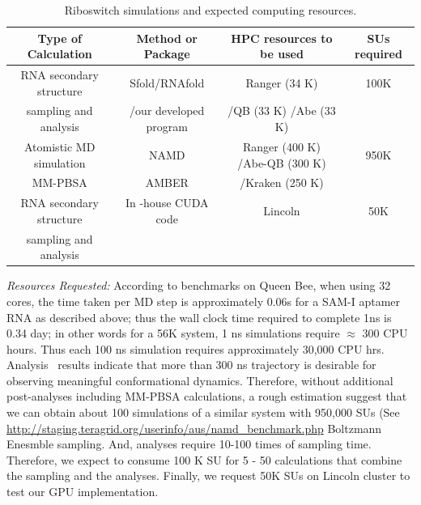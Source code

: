 \documentclass[a4paper,10pt]{article}
\newcommand{\up}{\vspace*{-1em}}
\begin{document}
\begin{table}[h]
\up
\begin{center}
  \caption{Riboswitch simulations and expected computing resources.  }
\label{table:systems}
\begin{tabular}{| c | c | c | c |}
\hline
Type of Calculation &   Method or Package  &    HPC resources to be used & SUs required \\
\hline \hline
RNA secondary structure &
Sfold/RNAfold& Ranger (34 K) & 100K\\ 
sampling and analysis  & /our developed program  & /QB (33 K) /Abe (33 K) & \\  \hline
Atomistic MD simulation & NAMD  & Ranger (400 K) /Abe-QB (300 K)  & 950K \\  
MM-PBSA        & AMBER    & /Kraken (250 K) &  \\ \hline
RNA secondary structure & In -house CUDA code & Lincoln & 50K \\
 sampling and analysis &   
&  &  \\
\hline
\end{tabular}
\up\up
\end{center}

\end{table}

{\it Resources Requested: } According to benchmarks on Queen Bee, when using 32 cores, the time taken per MD step is approximately 0.06s for a SAM-I aptamer RNA as described above; thus the wall clock time required to complete 1ns is 0.34 day; in other words for a 56K system, 1 ns simulations require $\approx$ 300 CPU hours.  Thus each 100 ns simulation requires approximately 30,000 CPU hrs.  Analysis~\cite{SAM-I-NAR2009} results indicate that more than 300 ns trajectory is desirable for observing meaningful conformational dynamics. Therefore, without additional post-analyses including MM-PBSA calculations, a rough estimation suggest that we can obtain about 100 simulations of a similar system with 950,000 SUs (See {\url{http://staging.teragrid.org/userinfo/aus/namd_benchmark.php}} Boltzmann Enesmble sampling.  And, analyses require 10-100 times of sampling time.  Therefore, we expect to consume 100 K SU for 5 - 50 calculations that combine the sampling and the analyses.  Finally, we request 50K SUs on Lincoln cluster to test our GPU implementation.
\end{document}
